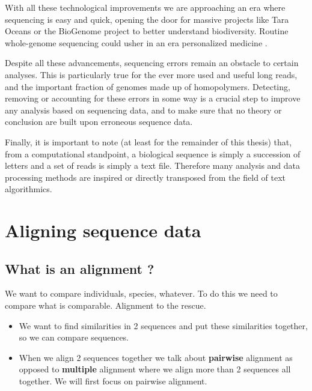 \documentclass[
  11pt,
  twoside]{scrbook}
\begin{document}
With all these technological improvements we are approaching an era where sequencing is easy and quick, opening the door for massive projects like Tara Oceans \autocite{sunagawaTaraOceansGlobal2020} or the BioGenome project \autocite{lewinEarthBioGenomeProject2018} to better understand biodiversity. Routine whole-genome sequencing could usher in an era personalized medicine \autocite{lightbodyReviewApplicationsHighthroughput2019}.

Despite all these advancements, sequencing errors remain an obstacle to certain analyses. This is particularly true for the ever more used and useful long reads, and the important fraction of genomes made up of homopolymers. Detecting, removing or accounting for these errors in some way is a crucial step to improve any analysis based on sequencing data, and to make sure that no theory or conclusion are built upon erroneous sequence data.

Finally, it is important to note (at least for the remainder of this thesis) that, from a computational standpoint, a biological sequence is simply a succession of letters and a set of reads is simply a text file. Therefore many analysis and data processing methods are inspired or directly transposed from the field of text algorithmics.

\printbibliography[segment=\therefsegment,heading=subbibintoc,title={References for chapter \thechapter}]

\hypertarget{aligning-sequence-data}{%
\chapter{Aligning sequence data}\label{aligning-sequence-data}}

\hypertarget{what-is-an-alignment}{%
\section{What is an alignment ?}\label{what-is-an-alignment}}

We want to compare individuals, species, whatever. To do this we need to compare what is comparable. Alignment to the rescue.

\begin{itemize}
\item
  We want to find similarities in 2 sequences and put these similarities together, so we can compare sequences.
\item
  When we align 2 sequences together we talk about \textbf{pairwise} alignment as opposed to \textbf{multiple} alignment where we align more than 2 sequences all together. We will first focus on pairwise alignment.
\end{itemize}
\end{document}
